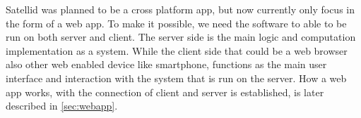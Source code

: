 Satellid was planned to be a cross platform app, but now currently only focus in the form of a web app.
To make it possible, we need the software to able to be run on both server and client.
The server side is the main logic and computation implementation as a system.
While the client side that could be a web browser also other web enabled device like smartphone, functions as the main user interface and interaction with the system that is run on the server.
How a web app works, with the connection of client and server is established, is later described in \autoref{sec:webapp}.
